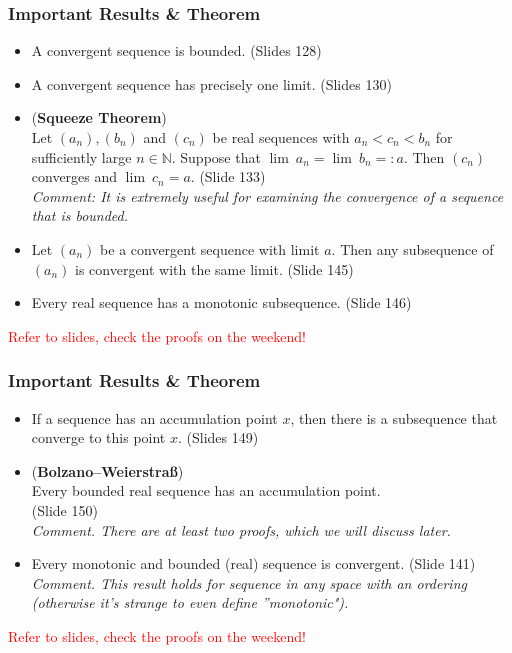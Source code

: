 \documentclass{beamer}
\newcommand{\myfont}{\rmfamily\normalsize\upshape\mdseries}
\begin{document}
\begin{frame}
    \frametitle{Important Results \& Theorem}
    \begin{itemize}
        \item A convergent sequence is bounded. (Slides 128)
        \item A convergent sequence has precisely one limit. (Slides 130)
        \item (\textbf{Squeeze Theorem}) \\Let $(a_n),(b_n)$ and $(c_n)$ be real sequences with $a_n<c_n<b_n$
              for sufficiently large $n\in\mathbb{N}$. Suppose that $\lim\ a_n=\lim\ b_n=:a$. Then
              $(c_n)$ converges and $\lim\ c_n=a$. (Slide 133)\\
              \itshape{Comment:} It is extremely useful for examining the convergence of a sequence that is bounded.
              \myfont
        \item Let $(a_n)$ be a convergent sequence with limit $a$. Then any subsequence of $(a_n)$
              is convergent with the same limit. (Slide 145)
        \item Every real sequence has a monotonic subsequence. (Slide 146)
    \end{itemize}
    \vspace{1em}
    \textcolor{red}{Refer to slides, check the proofs on the weekend!}
\end{frame}
\begin{frame}
    \frametitle{Important Results \& Theorem}
    \begin{itemize}
        \item If a sequence has an accumulation point $x$, then there is a subsequence that converge to this point $x$. (Slides 149)
        \item (\textbf{Bolzano--Weierstraß})\\ Every bounded real sequence has an accumulation point. \\(Slide 150)\\
              \itshape{Comment.} There are at least two proofs, which we will discuss later.
        \item \myfont Every monotonic and bounded (real) sequence is convergent. (Slide 141)\\
              \itshape{Comment.} This result holds for sequence in any space with an ordering (otherwise it's
              strange to even define ''monotonic").
    \end{itemize}
    \vspace{1em}
    \textcolor{red}{Refer to slides, check the proofs on the weekend!}
\end{frame}
\end{document}
